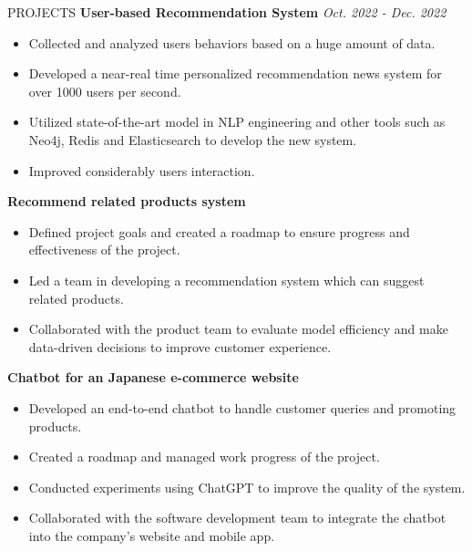 \documentclass{resume} %
\begin{document}
\begin{rSection}{PROJECTS}
    \textbf{User-based Recommendation System} \hfill {\textit{Oct. 2022 - Dec. 2022}}
    \begin{itemize}
        \item Collected and analyzed users behaviors based on a huge amount of data.
        \item Developed a near-real time personalized recommendation news system for over 1000 users per second.
        \item Utilized state-of-the-art model in NLP engineering and other tools such as Neo4j, Redis and Elasticsearch to develop the new system.
        \item Improved considerably users interaction.
    \end{itemize}
    
     
    \textbf{Recommend related products system}
     \begin{itemize}
     \setlength\itemsep{-0.5 em}
        \item Defined project goals and created a roadmap to ensure progress and effectiveness of the project.
        \item Led a team in developing a recommendation system which can suggest related products. 
         \item Collaborated with the product team to evaluate model efficiency and make data-driven decisions to improve customer experience.
     \end{itemize}

\textbf{Chatbot for an Japanese e-commerce website}
     \begin{itemize}
     \setlength\itemsep{-0.5 em}
        \item Developed an end-to-end chatbot to handle customer queries and promoting products.
        \item Created a roadmap and managed work progress of the project.
        \item Conducted experiments using ChatGPT to improve the quality of the system.
        \item Collaborated with the software development team to integrate the chatbot into the company's website and mobile app.
     \end{itemize}
     
     
\end{rSection}
\end{document}
